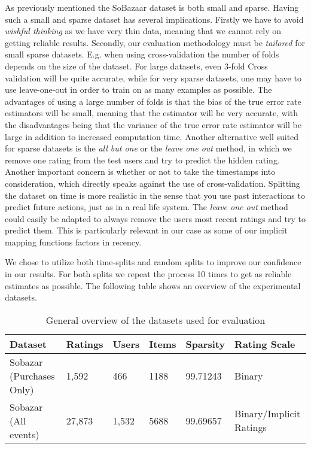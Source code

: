 As previously mentioned the SoBazaar dataset is both small and sparse.
Having such a small and sparse dataset has several implications. Firstly we have
to avoid \emph{wishful thinking} as we have very thin data, meaning that we cannot
rely on getting reliable results. Secondly, our evaluation methodology must be
\emph{tailored} for small sparse datasets. E.g. when using cross-validation the number
of folds depends on the size of the dataset. For large datasets, even 3-fold Cross
validation will be quite accurate, while for very sparse datasets, one may have to
use leave-one-out in order to train on as many examples as possible. The advantages
of using a large number of folds is that the bias of the true error rate estimators
will be small, meaning that the estimator will be very accurate, with the disadvantages
being that the variance of the true error rate estimator will be large in addition to
increased computation time. Another alternative well suited for sparse datasets is the
\emph{all but one} or the \emph{leave one out} method, in which we remove one rating
from the test users and try to predict the hidden rating.
Another important concern is whether or not to take the timestamps into consideration,
which directly speaks against the use of cross-validation. Splitting the dataset
on time is more realistic in the sense that you use past interactions to predict
future actions, just as in a real life system. The \emph{leave one out} method could
easily be adapted to always remove the users most recent ratings and try to predict
them. This is particularly relevant in our case as some of our implicit mapping functions
factors in recency.

We chose to utilize both time-splits and random splits to improve our confidence
in our results. For both splits we repeat the process 10 times to get as reliable
estimates as possible. The following table shows an overview of the experimental datasets.

\begin{table}[H]
    \centering
    \begin{tabular}{l l l l l l }
    \toprule
	Dataset						& 	Ratings		& 	Users		& 	Items 		& 	Sparsity	& Rating Scale 				    \\ \midrule
	Sobazar	(Purchases Only) 	&	1,592		&	466			&	1188		&	99.71243	& Binary						\\
	Sobazar (All events)		& 	27,873  	& 	1,532		&	5688		& 	99.69657	& Binary/Implicit Ratings		\\
	\bottomrule
    \end{tabular}
    \caption [Experimental datasets]{General overview of the datasets used for evaluation}
    \label{table:datasets}
\end{table}

